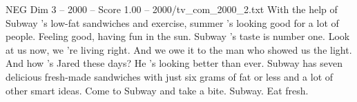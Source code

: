 \begin{textsample}{NEG Dim 3 – 2000 – Score 1.00 – 2000/tv\_com\_2000\_2.txt}  \label{ex:f3_neg_017}
With the help of Subway 's low-fat sandwiches and exercise, summer 's looking good for a lot of people.
Feeling good, having fun in the sun.
Subway 's taste is number one.
Look at us now, we 're living right.
And we owe it to the man who showed us the light.
And how 's Jared these days?
He 's looking better than ever.
Subway has seven delicious fresh-made sandwiches with just six grams of fat or less and a lot of other smart ideas.
Come to Subway and take a bite.
Subway.
Eat fresh.

\end{textsample}
